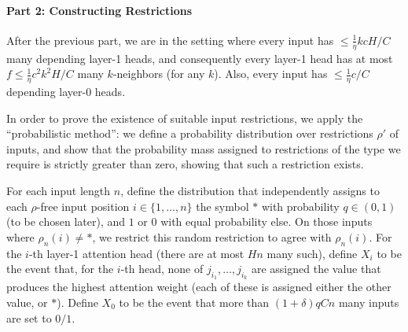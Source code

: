 \documentclass[11pt,a4paper]{article}
\begin{document}
\paragraph{Part 2: Constructing Restrictions}
After the previous part, we are in the setting where every input has $\leq \frac{1}{\eta}kcH/C$ many depending layer-1 heads, and consequently every layer-1 head has at most $f \leq \frac{1}{\eta}c^2k^2H/C$ many $k$-neighbors (for any $k$).
Also, every input has $\leq \frac{1}{\eta}c/C$ depending layer-0 heads.


In order to prove the existence of suitable input restrictions, we apply the ``probabilistic method'': we define a probability distribution over restrictions $\rho'$ of inputs, and show that the probability mass assigned to restrictions of the type we require is strictly greater than zero, showing that such a restriction exists.

For each input length $n$, define the distribution that independently assigns to each $\rho$-free input position $i \in \{1, \dots, n\}$ the symbol $*$ with probability $q \in (0,1)$ (to be chosen later), and $1$ or $0$ with equal probability else.
On those inputs where $\rho_n(i) \neq *$, we restrict this random restriction to agree with $\rho_n(i)$.
For the $i$-th layer-1 attention head (there are at most $Hn$ many such), define $X_i$ to be the event that, for the $i$-th head, none of $j_{i_1}, \dots, j_{i_k}$ are assigned the value that produces the highest attention weight (each of these is assigned either the other value, or $*$).
Define $X_0$ to be the event that more than $(1+\delta)qCn$ many inputs are set to $0/1$.
\end{document}
